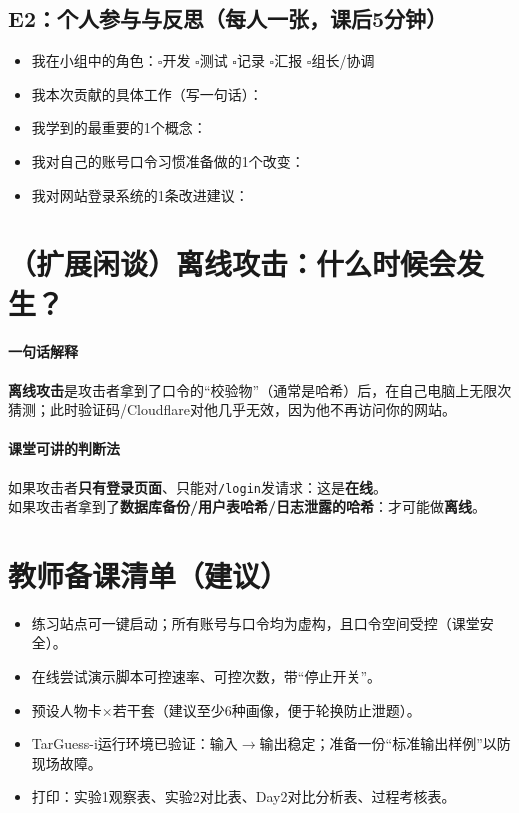 \documentclass[UTF8,a4paper,12pt]{ctexart}
\begin{document}
\subsection*{E2：个人参与与反思（每人一张，课后5分钟）}
\begin{itemize}
  \item 我在小组中的角色：$\square$开发 $\square$测试 $\square$记录 $\square$汇报 $\square$组长/协调
  \item 我本次贡献的具体工作（写一句话）：\underline{\hspace{24em}}
  \item 我学到的最重要的1个概念：\underline{\hspace{24em}}
  \item 我对自己的账号口令习惯准备做的1个改变：\underline{\hspace{24em}}
  \item 我对网站登录系统的1条改进建议：\underline{\hspace{24em}}
\end{itemize}

\section{（扩展闲谈）离线攻击：什么时候会发生？}
\paragraph{一句话解释}
\textbf{离线攻击}是攻击者拿到了口令的``校验物''（通常是哈希）后，在自己电脑上无限次猜测；此时验证码/Cloudflare对他几乎无效，因为他不再访问你的网站。

\paragraph{课堂可讲的判断法}
如果攻击者\textbf{只有登录页面}、只能对\texttt{/login}发请求：这是\textbf{在线}。\\
如果攻击者拿到了\textbf{数据库备份/用户表哈希/日志泄露的哈希}：才可能做\textbf{离线}。

\section{教师备课清单（建议）}
\begin{itemize}
  \item 练习站点可一键启动；所有账号与口令均为虚构，且口令空间受控（课堂安全）。
  \item 在线尝试演示脚本可控速率、可控次数，带``停止开关''。
  \item 预设人物卡$\times$若干套（建议至少6种画像，便于轮换防止泄题）。
  \item TarGuess-i运行环境已验证：输入$\rightarrow$输出稳定；准备一份``标准输出样例''以防现场故障。
  \item 打印：实验1观察表、实验2对比表、Day2对比分析表、过程考核表。
\end{itemize}
\end{document}
